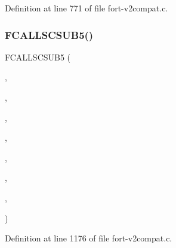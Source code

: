 Definition at line 771 of file fort-\/v2compat.\+c.

\mbox{\label{fort-v2compat_8c_aef8c75bdc8a1f1c314a308850b6a181f}} 
\subsubsection{\texorpdfstring{F\+C\+A\+L\+L\+S\+C\+S\+U\+B5()}{FCALLSCSUB5()}\hspace{0.1cm}{\footnotesize\ttfamily [4/8]}}
{\footnotesize\ttfamily F\+C\+A\+L\+L\+S\+C\+S\+U\+B5 (\begin{DoxyParamCaption}\item[{\hyperlink{nf__v2compat_8c_a3cfcd4ee8ba5397ab91260bc46f4ded9}{c\+\_\+ncvgt1}}]{,  }\item[{N\+C\+V\+G\+T1}]{,  }\item[{\hyperlink{nf__fortv2_8f90_a6c63eb6533f6fd980258f9ded00cf4e1}{ncvgt1}}]{,  }\item[{N\+C\+ID}]{,  }\item[{V\+A\+R\+ID}]{,  }\item[{C\+O\+O\+R\+DS}]{,  }\item[{P\+V\+O\+ID}]{,  }\item[{\hyperlink{fort-v2compat_8c_ae2352f39cbd25bcaf1bedbbb12db73fe}{P\+R\+C\+O\+DE}}]{ }\end{DoxyParamCaption})}



Definition at line 1176 of file fort-\/v2compat.\+c.

\mbox{\label{fort-v2compat_8c_a2839404407c4a0e04c3444d0529c7ab8}} 
